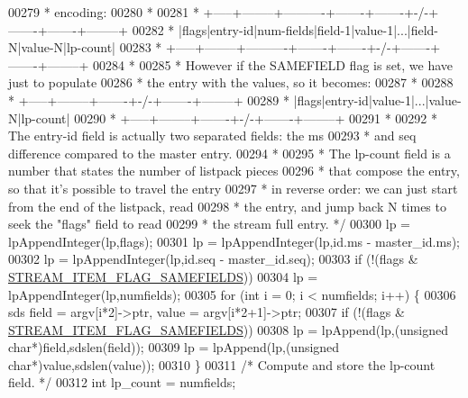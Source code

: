 \begin{DoxyCode}
{00279 \textcolor{comment}{     * encoding:}
00280 \textcolor{comment}{     *}
00281 \textcolor{comment}{     * +-----+--------+----------+-------+-------+-/-+-------+-------+--------+}
00282 \textcolor{comment}{     * |flags|entry-id|num-fields|field-1|value-1|...|field-N|value-N|lp-count|}
00283 \textcolor{comment}{     * +-----+--------+----------+-------+-------+-/-+-------+-------+--------+}
00284 \textcolor{comment}{     *}
00285 \textcolor{comment}{     * However if the SAMEFIELD flag is set, we have just to populate}
00286 \textcolor{comment}{     * the entry with the values, so it becomes:}
00287 \textcolor{comment}{     *}
00288 \textcolor{comment}{     * +-----+--------+-------+-/-+-------+--------+}
00289 \textcolor{comment}{     * |flags|entry-id|value-1|...|value-N|lp-count|}
00290 \textcolor{comment}{     * +-----+--------+-------+-/-+-------+--------+}
00291 \textcolor{comment}{     *}
00292 \textcolor{comment}{     * The entry-id field is actually two separated fields: the ms}
00293 \textcolor{comment}{     * and seq difference compared to the master entry.}
00294 \textcolor{comment}{     *}
00295 \textcolor{comment}{     * The lp-count field is a number that states the number of listpack pieces}
00296 \textcolor{comment}{     * that compose the entry, so that it's possible to travel the entry}
00297 \textcolor{comment}{     * in reverse order: we can just start from the end of the listpack, read}
00298 \textcolor{comment}{     * the entry, and jump back N times to seek the "flags" field to read}
00299 \textcolor{comment}{     * the stream full entry. */}
00300     lp = lpAppendInteger(lp,flags);
00301     lp = lpAppendInteger(lp,id.ms - master\_id.ms);
00302     lp = lpAppendInteger(lp,id.seq - master\_id.seq);
00303     \textcolor{keywordflow}{if} (!(flags & \hyperlink{t__stream_8c_a6977b456a646762a7650d432a06dc6c5}{STREAM\_ITEM\_FLAG\_SAMEFIELDS}))
00304         lp = lpAppendInteger(lp,numfields);
00305     \textcolor{keywordflow}{for} (\textcolor{keywordtype}{int} i = 0; i < numfields; i++) \{
00306         sds field = argv[i*2]->ptr, value = argv[i*2+1]->ptr;
00307         \textcolor{keywordflow}{if} (!(flags & \hyperlink{t__stream_8c_a6977b456a646762a7650d432a06dc6c5}{STREAM\_ITEM\_FLAG\_SAMEFIELDS}))
00308             lp = lpAppend(lp,(\textcolor{keywordtype}{unsigned} \textcolor{keywordtype}{char}*)field,sdslen(field));
00309         lp = lpAppend(lp,(\textcolor{keywordtype}{unsigned} \textcolor{keywordtype}{char}*)value,sdslen(value));
00310     \}
00311     \textcolor{comment}{/* Compute and store the lp-count field. */}
00312     \textcolor{keywordtype}{int} lp\_count = numfields;
}
\end{DoxyCode}
